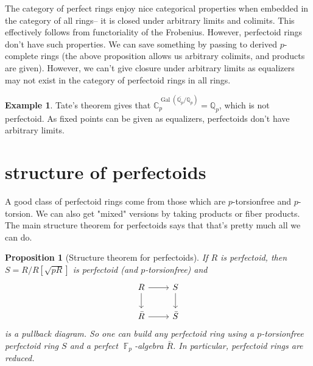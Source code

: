 \documentclass[12pt]{amsproc}
\newtheorem*{prop}{Proposition}
\theoremstyle{definition}
\newtheorem*{example}{Example}
\newcommand{\Q}{\mathbb{Q}}
\DeclareMathOperator{\F}{\mathbb{F}}
\DeclareMathOperator{\Gal}{Gal}
\begin{document}
The category of perfect rings enjoy nice categorical properties when embedded in the category of all rings-- it is closed under arbitrary limits and colimits. This effectively follows from functoriality of the Frobenius. However, perfectoid rings don't have such properties. We can save something by passing to derived $p$-complete rings (the above proposition allows us arbitrary colimits, and products are given). However, we can't give closure under arbitrary limits as equalizers may not exist in the category of perfectoid rings in all rings.

\begin{example} Tate's theorem gives that $\mathbb{C}_p^{\Gal(\bar{\Q_p}/\Q_p)}=\Q_p$, which is not perfectoid. As fixed points can be given as equalizers, perfectoids don't have arbitrary limits.
\end{example}

\section{structure of perfectoids}

A good class of perfectoid rings come from those which are $p$-torsionfree and $p$-torsion. We can also get "mixed" versions by taking products or fiber products. The main structure theorem for perfectoids says that that's pretty much all we can do.

\begin{prop}[Structure theorem for perfectoids] If $R$ is perfectoid, then $S=R/R[\sqrt{pR}]$ is perfectoid (and $p$-torsionfree) and
\[\begin{tikzcd}
R\arrow[r]\arrow[d]& S\arrow[d]\\
\bar{R}\arrow[r]&\bar{S}
\end{tikzcd}\]	
is a pullback diagram. So one can build any perfectoid ring using a $p$-torsionfree perfectoid ring $S$ and a perfect $\F_p$-algebra $\bar{R}$. In particular, perfectoid rings are reduced.
\end{prop}
\end{document}
